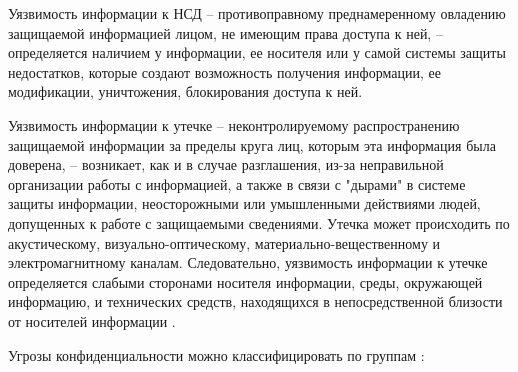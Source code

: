 Уязвимость информации к НСД – противоправному преднамеренному овладению защищаемой информацией лицом,
не имеющим права доступа к ней, – определяется наличием у информации, ее носителя или у самой системы
защиты недостатков, которые создают возможность получения информации, ее модификации, уничтожения,
блокирования доступа к ней.

Уязвимость информации к утечке – неконтролируемому распространению защищаемой информации за пределы круга лиц,
которым эта информация была доверена, – возникает, как и в случае разглашения, из-за неправильной организации
работы с информацией, а также в связи с "дырами" в системе защиты информации, неосторожными или умышленными
действиями людей, допущенных к работе с защищаемыми сведениями. Утечка может происходить по акустическому,
визуально-оптическому, материально-вещественному и электромагнитному каналам. Следовательно, уязвимость
информации к утечке определяется слабыми сторонами носителя информации, среды, окружающей информацию,
и технических средств, находящихся в непосредственной близости от носителей информации \cite{univermvd-eios}.

Угрозы конфиденциальности можно классифицировать по группам \cite{RT-SOLAR-conf}:

